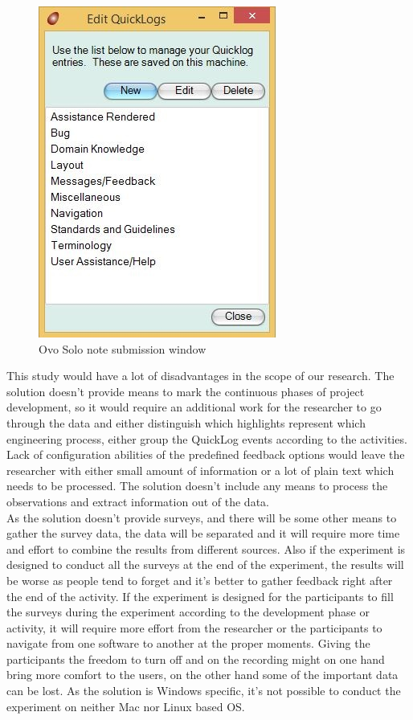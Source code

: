    \begin{figure}[htb]
 \centering
\includegraphics{figures/ovosolo_edit.jpg}
\caption{Ovo Solo note submission window}
\label{fig:ovosolo_edit}
 \end{figure}

This study would have a lot of disadvantages in the scope of our research. The solution doesn't provide means to mark the continuous phases of project development, so it would require an additional work for the researcher to go through the data and either distinguish which highlights represent which engineering process, either group the QuickLog events according to the activities. Lack of configuration abilities of the predefined feedback options would leave the researcher with either small amount of information or a lot of plain text which needs to be processed. The solution doesn't include any means to process the observations and extract information out of the data.\\

As the solution doesn't provide surveys, and there will be some other means to gather the survey data, the data will be separated and it will require more time and effort to combine the results from different sources. Also if the experiment is designed to conduct all the surveys at the end of the experiment, the results will be worse as people tend to forget and it's better to gather feedback right after the end of the activity. If the experiment is designed for the participants to fill the surveys during the experiment according to the development phase or activity, it will require more effort from the researcher or the participants to navigate from one software to another at the proper moments. Giving the participants the freedom to turn off and on the recording might on one hand bring more comfort to the users, on the other hand some of the important data can be lost. As the solution is Windows specific, it's not possible to conduct the experiment on neither Mac nor Linux based OS.\\


